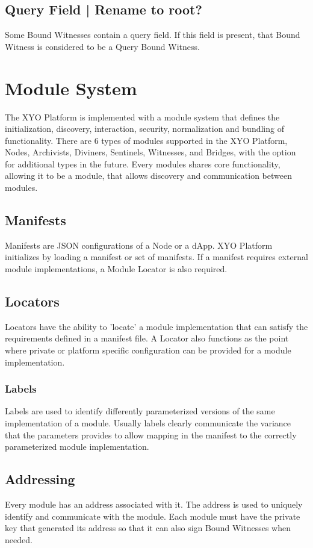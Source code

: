 \documentclass{article}
\begin{document}
\subsection{Query Field | Rename to root?}
Some Bound Witnesses contain a query field.  If this field is present, that Bound Witness is considered to be a Query Bound Witness.  

\clearpage

\section{Module System}
The XYO Platform is implemented with a module system that defines the initialization, discovery, interaction, security, normalization and bundling of functionality.  There are 6 types of modules supported in the XYO Platform, Nodes, Archivists, Diviners, Sentinels, Witnesses, and Bridges, with the option for additional types in the future. Every modules shares core functionality, allowing it to be a module, that allows discovery and communication between modules.

\subsection{Manifests}
Manifests are JSON configurations of a Node or a dApp.
XYO Platform initializes by loading a manifest or set of manifests.  If a manifest requires external module implementations, a Module Locator is also required.

\subsection{Locators}
Locators have the ability to 'locate' a module implementation that can satisfy the requirements defined in a manifest file.  A Locator also functions as the point where private or platform specific configuration can be provided for a module implementation.

\subsubsection{Labels}
Labels are used to identify differently parameterized versions of the same implementation of a module.  Usually labels clearly communicate the variance that the parameters provides to allow mapping in the manifest to the correctly parameterized module implementation.

\subsection{Addressing}
Every module has an address associated with it.  The address is used to uniquely identify and communicate with the module.  Each module must have the private key that generated its address so that it can also sign Bound Witnesses when needed.
\end{document}
